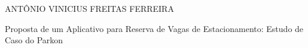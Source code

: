 
\pagestyle{ruledheader}
\setcounter{page}{1}


\cleardoublepage
\thispagestyle{empty}

\vspace{-60mm}

\begin{center}
   {\large ANTÔNIO VINICIUS FREITAS FERREIRA}\\
   \vspace{7mm}

   Proposta de um Aplicativo para Reserva de Vagas de Estacionamento: Estudo de Caso do Parkon\\
  \vspace{10mm}
\end{center}

